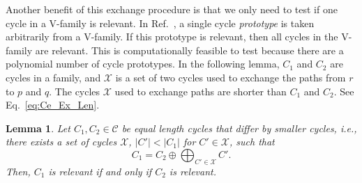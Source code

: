 \documentclass[fleqn,11pt]{article}
\newtheorem{lemma}[theorem]{Lemma}
\newcommand\calX{\mathcal{X}}     %
\newcommand\CycSp{\mathcal{C}}    %
\begin{document}

Another benefit of this exchange procedure is that we only need to test if one cycle in a V-family is relevant. In Ref.~\cite{vismaraUnion1997}, a single cycle \textit{prototype} is taken arbitrarily from a V-family. If this prototype is relevant, then all cycles in the V-family are relevant. 
This is computationally feasible to test because there are a polynomial number of cycle prototypes.
In the following lemma, $C_1$ and $C_2$ are cycles in a family, and $\calX$ is a set of two cycles used to exchange the paths from $r$ to $p$ and $q$. The cycles $\calX$ used to exchange paths are shorter than $C_1$ and $C_2$. See Eq.~\eqref{eq:Ce_Ex_Len}.

\begin{lemma}
	Let $C_1,C_2\in\CycSp$ be equal length cycles that differ by smaller cycles, i.e., there exists a set of cycles $\calX$, $|C'|<|C_1|$ for $C'\in\calX$, such that
	\begin{equation}
		C_1 = C_2\oplus\bigoplus_{C'\in\calX} C'.\label{eq:C1_C2_sm_c}
	\end{equation}
	Then, $C_1$ is relevant if and only if $C_2$ is relevant. 
\end{lemma}
\end{document}
